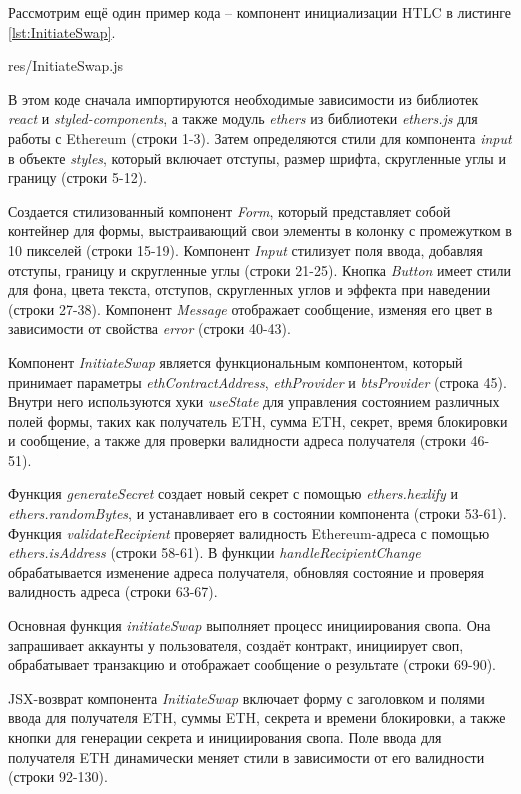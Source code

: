 Рассмотрим ещё один пример кода -- компонент инициализации HTLC в листинге \ref{lst:InitiateSwap}.


{res/InitiateSwap.js}

В этом коде сначала импортируются необходимые зависимости из библиотек \textit{react} и \textit{styled-components}, а также модуль \textit{ethers} из библиотеки \textit{ethers.js} для работы с Ethereum (строки 1-3). Затем определяются стили для компонента \textit{input} в объекте \textit{styles}, который включает отступы, размер шрифта, скругленные углы и границу (строки 5-12).

Создается стилизованный компонент \textit{Form}, который представляет собой контейнер для формы, выстраивающий свои элементы в колонку с промежутком в 10 пикселей (строки 15-19). Компонент \textit{Input} стилизует поля ввода, добавляя отступы, границу и скругленные углы (строки 21-25). Кнопка \textit{Button} имеет стили для фона, цвета текста, отступов, скругленных углов и эффекта при наведении (строки 27-38). Компонент \textit{Message} отображает сообщение, изменяя его цвет в зависимости от свойства \textit{error} (строки 40-43).

Компонент \textit{InitiateSwap} является функциональным компонентом, который принимает параметры \textit{ethContractAddress}, \textit{ethProvider} и \textit{btsProvider} (строка 45). Внутри него используются хуки \textit{useState} для управления состоянием различных полей формы, таких как получатель ETH, сумма ETH, секрет, время блокировки и сообщение, а также для проверки валидности адреса получателя (строки 46-51).

Функция \textit{generateSecret} создает новый секрет с помощью \textit{ethers.hexlify} и \textit{ethers.randomBytes}, и устанавливает его в состоянии компонента (строки 53-61). Функция \textit{validateRecipient} проверяет валидность Ethereum-адреса с помощью \textit{ethers.isAddress} (строки 58-61). В функции \textit{handleRecipientChange} обрабатывается изменение адреса получателя, обновляя состояние и проверяя валидность адреса (строки 63-67).

Основная функция \textit{initiateSwap} выполняет процесс инициирования свопа. Она запрашивает аккаунты у пользователя, создаёт контракт, инициирует своп, обрабатывает транзакцию и отображает сообщение о результате (строки 69-90). 

JSX-возврат компонента \textit{InitiateSwap} включает форму с заголовком и полями ввода для получателя ETH, суммы ETH, секрета и времени блокировки, а также кнопки для генерации секрета и инициирования свопа. Поле ввода для получателя ETH динамически меняет стили в зависимости от его валидности (строки 92-130).


